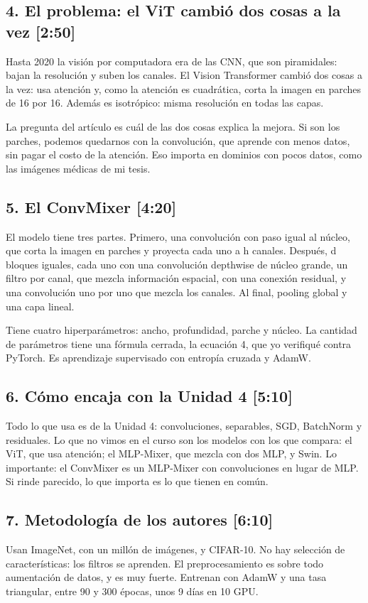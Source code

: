 \documentclass[11pt,a4paper]{article}
\begin{document}
\subsection{4. El problema: el ViT cambió dos cosas a la vez \hfill \normalfont\small [2:50]}
Hasta 2020 la visión por computadora era de las CNN, que son piramidales: bajan la resolución y suben los canales. El Vision Transformer cambió dos cosas a la vez: usa atención y, como la atención es cuadrática, corta la imagen en parches de 16 por 16. Además es isotrópico: misma resolución en todas las capas.

La pregunta del artículo es cuál de las dos cosas explica la mejora. Si son los parches, podemos quedarnos con la convolución, que aprende con menos datos, sin pagar el costo de la atención. Eso importa en dominios con pocos datos, como las imágenes médicas de mi tesis.

\subsection{5. El ConvMixer \hfill \normalfont\small [4:20]}
El modelo tiene tres partes. Primero, una convolución con paso igual al núcleo, que corta la imagen en parches y proyecta cada uno a h canales. Después, d bloques iguales, cada uno con una convolución depthwise de núcleo grande, un filtro por canal, que mezcla información espacial, con una conexión residual, y una convolución uno por uno que mezcla los canales. Al final, pooling global y una capa lineal.

Tiene cuatro hiperparámetros: ancho, profundidad, parche y núcleo. La cantidad de parámetros tiene una fórmula cerrada, la ecuación 4, que yo verifiqué contra PyTorch. Es aprendizaje supervisado con entropía cruzada y AdamW.

\subsection{6. Cómo encaja con la Unidad 4 \hfill \normalfont\small [5:10]}
Todo lo que usa es de la Unidad 4: convoluciones, separables, SGD, BatchNorm y residuales. Lo que no vimos en el curso son los modelos con los que compara: el ViT, que usa atención; el MLP-Mixer, que mezcla con dos MLP, y Swin. Lo importante: el ConvMixer es un MLP-Mixer con convoluciones en lugar de MLP. Si rinde parecido, lo que importa es lo que tienen en común.

\subsection{7. Metodología de los autores \hfill \normalfont\small [6:10]}
Usan ImageNet, con un millón de imágenes, y CIFAR-10. No hay selección de características: los filtros se aprenden. El preprocesamiento es sobre todo aumentación de datos, y es muy fuerte. Entrenan con AdamW y una tasa triangular, entre 90 y 300 épocas, unos 9 días en 10 GPU.
\end{document}
